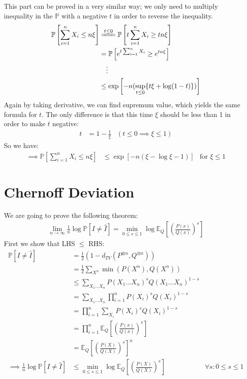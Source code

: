 \documentclass{article}
\numberwithin{equation}{section}
\newcommand{\EX}[2][]{\mathbb{E}_{#1}\left[#2\right]}%
\newcommand{\prob}[1]{\mathbb{P}\left[#1\right]}%
\begin{document}
\subsection{}
This part can be proved in a very similar way;
we only need to multiply inequality in the \(\mathbb{P}\) with a negative \(t\) in order to reverse the inequality.
\begin{align}
\prob{\sum_{i=1}^n X_i \le n\xi} &\xlongequal{t\le 0} \prob{t\sum_{i=1}^n X_i \ge tn\xi}\\
&=\prob{e^{t\sum_{i=1}^n X_i} \ge e^{tn\xi}}\\
&\quad \vdots \tag*{}\\
& \le \exp\left[-n(\sup_{t\le 0}\{t\xi + \log (1-t)\}) \right]
\end{align} 
Again by taking derivative, we can find supremum value, which yields the same formula for \(t\).
The only difference is that this time \(\xi\) should be less than 1 in order to make \(t\) negative:
\begin{align}
t &= 1 - \frac{1}{\xi} & (t\le 0 \implies \xi \le 1)
\end{align}
So we have:
\begin{align}
\implies \prob{\sum_{i=1}^n X_i \le n\xi} &\le \exp\left[-n(\xi - \log \xi - 1) \right] & \text{for } \xi \le 1
\end{align}

\section{Chernoff Deviation}
We are going to prove the following theorem:
\begin{align}
\lim_{n \to \infty} \frac{1}{n}\log \prob{I \neq \hat{I}} = \min_{0\le s \le 1} \log \EX[Q]{(\frac{P(x)}{Q(x)})^s}
\end{align}
First we show that LHS \(\le\) RHS:
\begin{align}
\prob{I \neq \hat{I}} &= \frac{1}{2}(1 - d_{TV}(P^{\otimes n}, Q^{\otimes n}))\\
&= \frac{1}{2} \sum_{X^n}\min (P(X^n), Q(X^n))\\
&\le \sum_{X_1\ldots X_n} P(X_1\ldots X_n)^s Q(X_1\ldots X_n)^{1-s}\\
&= \sum_{X_1\ldots X_n} \prod_{i=1}^n P(X_i)^s Q(X_i)^{1-s}\\
&= \prod_{i=1}^n \sum_{X_i} P(X_i)^s Q(X_i)^{1-s}\\
&= \prod_{i=1}^n \EX[Q]{(\frac{P(x)}{Q(x)})^s}\\
&= \EX[Q]{(\frac{P(X)}{Q(X)})^s}^n\\
\implies \frac{1}{n} \log \prob{I \neq \hat{I}} &\le \min_{0\le s \le 1} \log \EX[Q]{(\frac{P(X)}{Q(X)})^s}& \forall s: 0 \le s \le 1
\label{eq:LHS-le-RHS}
\end{align}
\end{document}
